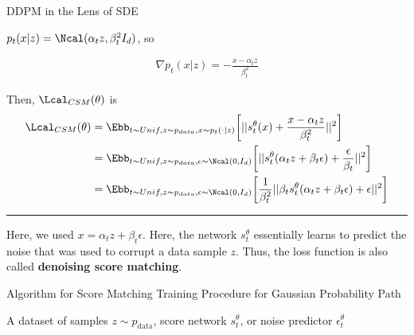 \documentclass[aspectratio=169,xcolor=dvipsnames,svgnames,x11names,fleqn]{beamer}
\begin{document}
\begin{frame}{DDPM in the Lens of SDE}

    \footnotesize

    $p_t(x|z) = \Ncal(\alpha_t z, \beta_t^2 I_d)$, so 

    \begin{align*}
        \nabla p_t(x|z) = -\frac{x-\alpha_t z}{\beta_t^2}
    \end{align*}

    Then, $\Lcal_{CSM}(\theta)$ is 
    \begin{align*}
        \Lcal_{CSM}(\theta)  & = \Ebb_{t\sim Unif, z \sim p_{data}, x\sim p_t(\cdot | z)} \bigg[ || s_t^\theta(x)  + \frac{x- \alpha_t z}{\beta_t^2} || ^2 \bigg]\\
                & = \Ebb_{t\sim Unif, z \sim p_{data}, \epsilon \sim \Ncal(0, I_d)} \bigg [  ||s_t^\theta (\alpha_t z + \beta_t \epsilon) + \frac{\epsilon}{\beta_t}||^2 \bigg]\\
                & = \Ebb_{t\sim Unif, z \sim p_{data}, \epsilon \sim \Ncal(0, I_d)} \bigg [ \frac{1}{\beta_t^2}|| \beta_t s_t^\theta (\alpha_t z + \beta_t\epsilon) + \epsilon||^2 \bigg]
    \end{align*}
    
                \vspace{10pt}

    {\color{hunterGreen}\hrule}

    \vspace{10pt}

    Here, we used $ x = \alpha_t z + \beta_t \epsilon$. Here, the network $s_t^\theta$ essentially learns to predict the noise that was used to corrupt a data sample $z$. Thus, the loss function is also called \textbf{denoising score matching}.
\end{frame}

\begin{frame}{Algorithm for Score Matching Training Procedure for Gaussian Probability Path}

    \begin{algorithm}[H]
\caption{\textbf{Score Matching Training Procedure for Gaussian Probability Path}}
\label{alg:cfg_training}
 A dataset of samples $z \sim p_{\mathrm{data}}$,
score network $s_t^{\theta}$, or noise predictor $\epsilon_t^\theta$\;

\end{algorithm}
    
\end{frame}
\end{document}
